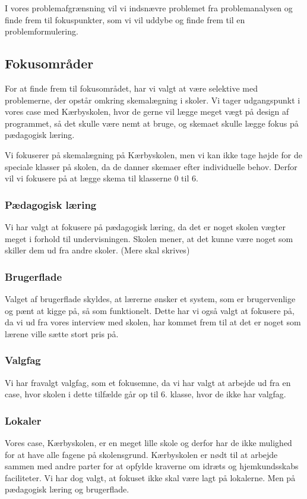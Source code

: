 
I vores problemafgrænsning vil vi indsnævre problemet fra problemanalysen og finde frem til fokuspunkter, som vi vil uddybe og finde frem til en problemformulering.

\subsection{Fokusområder}
For at finde frem til fokusområdet, har vi valgt at være selektive med problemerne, der opstår omkring skemalægning i skoler. Vi tager udgangspunkt i vores case med Kærbyskolen, hvor de gerne vil lægge meget vægt på design af programmet, så det skulle være nemt at bruge, og skemaet skulle lægge fokus på pædagogisk læring. 

Vi fokuserer på skemalægning på Kærbyskolen, men vi kan ikke tage højde for de speciale klasser på skolen, da de danner skemaer efter individuelle behov. Derfor vil vi fokusere på at lægge skema til klasserne 0 til 6.

\subsubsection{Pædagogisk læring}
Vi har valgt at fokusere på pædagogisk læring, da det er noget skolen vægter meget i forhold til undervisningen. Skolen mener, at det kunne være noget som skiller dem ud fra andre skoler.
(Mere skal skrives)

\subsubsection{Brugerflade}
Valget af brugerflade skyldes, at lærerne ønsker et system, som er brugervenlige og pænt at kigge på, så som funktionelt. Dette har vi også valgt at fokusere på, da vi ud fra vores interview med skolen, har kommet frem til at det er noget som lærene ville sætte stort pris på.

\subsubsection{Valgfag}
Vi har fravalgt valgfag, som et fokusemne, da vi har valgt at arbejde ud fra en case, hvor skolen i dette tilfælde går op til 6. klasse, hvor de ikke har valgfag.

\subsubsection{Lokaler}
Vores case, Kærbyskolen, er en meget lille skole og derfor  har de ikke mulighed for at have alle fagene på skolensgrund. Kærbyskolen er nødt til at arbejde sammen med andre parter for at opfylde kraverne om idræts og hjemkundsskabs faciliteter. Vi har dog valgt, at fokuset ikke skal være lagt på lokalerne. Men på pædagogisk læring og brugerflade.

